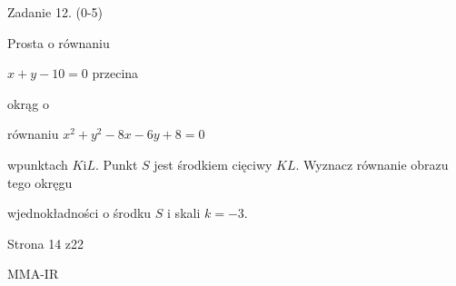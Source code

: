 \documentclass[a4paper,12pt]{article}
\begin{document}
Zadanie 12. (0-5)

Prosta o równaniu

$x+y-10=0$ przecina

okrąg o

równaniu $x^{2}+y^{2}-8x-6y+8=0$

wpunktach $K\mathrm{i}L$. Punkt $S$ jest środkiem cięciwy $KL$. Wyznacz równanie obrazu tego okręgu

wjednokładności o środku $S$ i skali $k=-3.$

Strona 14 z22

MMA-IR
\end{document}
